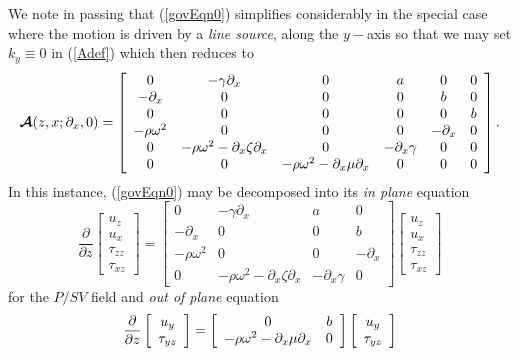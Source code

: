 We note in passing that (\ref{govEqn0}) simplifies considerably in the 
special case where the motion is driven by a {\em line source\/}, along 
the $y-$axis so that we may set  $k_y\equiv 0$ in (\ref{Adef}) which then 
reduces to
\[
{\mbox{\boldmath$\cal A$\unboldmath}}(z,x;{\partial }_{x},0)
=\left[{\begin{array}{cccccc}
0&- \gamma {\partial }_{  x}&  0&  a&0&0\\ -{ \partial 
}_{x}&0&0&0&b&0\\ 0&0&0&0&0&b\\ - \rho {\omega }^{  
2}&  0&0&0&-{ \partial }_{x}&0\\ 0&- \rho {\omega 
}^{  2}  -{ \partial }_{x} \zeta {\partial }_{  
x} &  
0&  -{ \partial }_{x} \gamma &  0&0\\ 
0&0 &  - \rho {\omega }^{  2}  
 -{ \partial }_{x} \mu 
{\partial }_{  x}& 0 &  0&0\end{array}}\right].
\] 
In this instance,  (\ref{govEqn0}) may be decomposed into its {\em in plane\/} 
equation
\begin{equation} 	\label{PSVeqn}
{\frac{ \partial }{\partial z}}\left[{\begin{array}{c}{u}_{z}\\
{u}_{x}\\
{\tau }_{zz}\\
{\tau }_{xz}\end{array}}\right]
=\left[{\begin{array}{cccc}
0&- \gamma {\partial }_{  x}&  a&0\\ 
-{ \partial }_{x}&0&0&b\\
- \rho {\omega }^{  2}&  0&0&-{ \partial }_{x}\\ 
0&- \rho {\omega }^{  2}  -{ \partial }_{x} \zeta {\partial }_{  x} & 
 -{ \partial }_{x} \gamma &  0 
\end{array}}\right]
\left[{\begin{array}{c}{u}_{z}\\
{u}_{x}\\
{\tau }_{zz}\\
{\tau }_{xz}\end{array}}\right]
\end{equation}
for the $P/SV$ field and {\em out of plane\/} equation 
\begin{equation} 	\label{SHeqn}
	{\frac{\partial }{\partial z}}\left[{\begin{array}{c}{u}_{y}\\
	{\rm \tau }_{yz}\end{array}}\right]
	=\left[{\begin{array}{cc}
	0&b\\ 
	- \rho {\omega }^{  2}-{ \partial }_{x} \mu {\partial }_{  x}& 0
	\end{array}}\right]
	\left[{\begin{array}{c}{u}_{y}\\
	{\rm \tau }_{yz}\end{array}}\right]
\end{equation}
